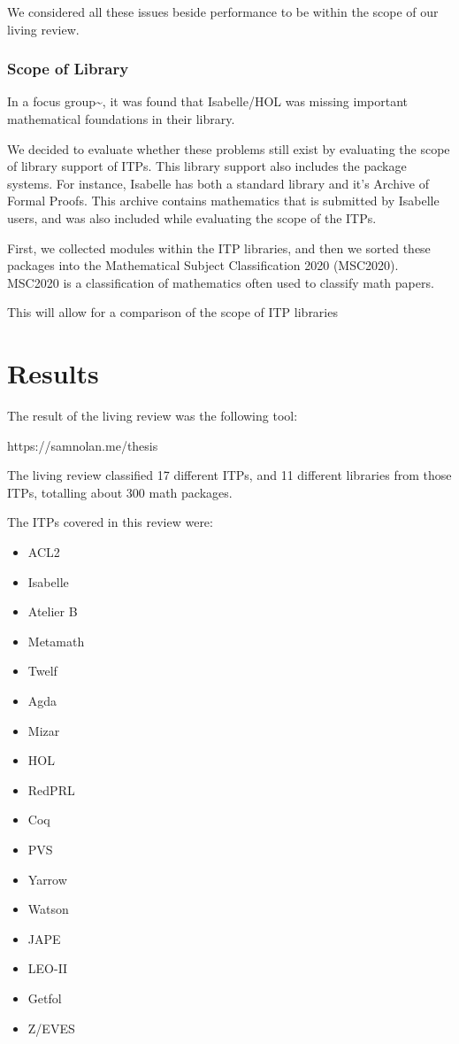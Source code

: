 \documentclass[
]{article}
\providecommand{\tightlist}{%
  \setlength{\itemsep}{0pt}\setlength{\parskip}{0pt}}
\begin{document}
We considered all these issues beside performance to be within the scope
of our living review.

\hypertarget{scope-of-library}{%
\subsubsection{Scope of Library}\label{scope-of-library}}

In a focus group\textasciitilde{}\cite{beckert_usability_2015}, it was
found that Isabelle/HOL was missing important mathematical foundations
in their library.

We decided to evaluate whether these problems still exist by evaluating
the scope of library support of ITPs. This library support also includes
the package systems. For instance, Isabelle has both a standard library
and it's Archive of Formal Proofs. This archive contains mathematics
that is submitted by Isabelle users, and was also included while
evaluating the scope of the ITPs.

First, we collected modules within the ITP libraries, and then we sorted
these packages into the Mathematical Subject Classification 2020
(MSC2020). MSC2020 is a classification of mathematics often used to
classify math papers.

This will allow for a comparison of the scope of ITP libraries

\hypertarget{results}{%
\section{Results}\label{results}}

The result of the living review was the following tool:

\hypertarget{itps}{}

https://samnolan.me/thesis

The living review classified 17 different ITPs, and 11 different
libraries from those ITPs, totalling about 300 math packages.

The ITPs covered in this review were:

\begin{itemize}
\tightlist
\item
  ACL2
\item
  Isabelle
\item
  Atelier B
\item
  Metamath
\item
  Twelf
\item
  Agda
\item
  Mizar
\item
  HOL
\item
  RedPRL
\item
  Coq
\item
  PVS
\item
  Yarrow
\item
  Watson
\item
  JAPE
\item
  LEO-II
\item
  Getfol
\item
  Z/EVES
\end{itemize}
\end{document}
